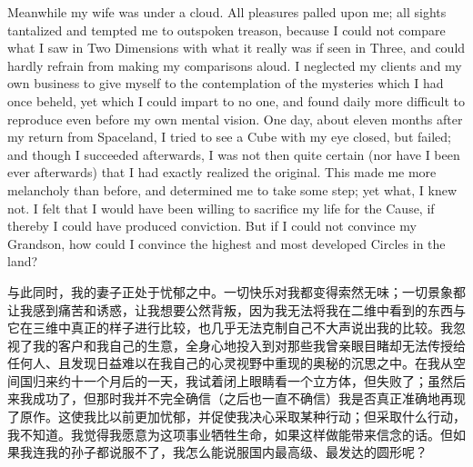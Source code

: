 \documentclass[12pt,UTF8]{ctexbook}
\begin{document}
Meanwhile my wife was under a cloud. All pleasures palled upon me; all sights tantalized and tempted me to outspoken treason, because I could not compare what I saw in Two Dimensions with what it really was if seen in Three, and could hardly refrain from making my comparisons aloud. I neglected my clients and my own business to give myself to the contemplation of the mysteries which I had once beheld, yet which I could impart to no one, and found daily more difficult to reproduce even before my own mental vision. One day, about eleven months after my return from Spaceland, I tried to see a Cube with my eye closed, but failed; and though I succeeded afterwards, I was not then quite certain (nor have I been ever afterwards) that I had exactly realized the original. This made me more melancholy than before, and determined me to take some step; yet what, I knew not. I felt that I would have been willing to sacrifice my life for the Cause, if thereby I could have produced conviction. But if I could not convince my Grandson, how could I convince the highest and most developed Circles in the land?

与此同时，我的妻子正处于忧郁之中。一切快乐对我都变得索然无味；一切景象都让我感到痛苦和诱惑，让我想要公然背叛，因为我无法将我在二维中看到的东西与它在三维中真正的样子进行比较，也几乎无法克制自己不大声说出我的比较。我忽视了我的客户和我自己的生意，全身心地投入到对那些我曾亲眼目睹却无法传授给任何人、且发现日益难以在我自己的心灵视野中重现的奥秘的沉思之中。在我从空间国归来约十一个月后的一天，我试着闭上眼睛看一个立方体，但失败了；虽然后来我成功了，但那时我并不完全确信（之后也一直不确信）我是否真正准确地再现了原作。这使我比以前更加忧郁，并促使我决心采取某种行动；但采取什么行动，我不知道。我觉得我愿意为这项事业牺牲生命，如果这样做能带来信念的话。但如果我连我的孙子都说服不了，我怎么能说服国内最高级、最发达的圆形呢？
\end{document}

